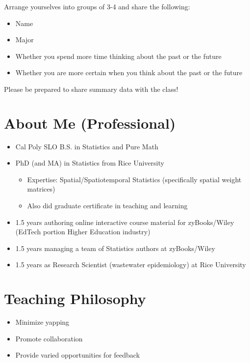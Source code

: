 \documentclass[
  letterpaper,
  DIV=11,
  numbers=noendperiod]{scrreprt}
\begin{document}
Arrange yourselves into groups of 3-4 and share the following:

\begin{itemize}
\item
  Name
\item
  Major
\item
  Whether you spend more time thinking about the past or the future
\item
  Whether you are more certain when you think about the past or the
  future
\end{itemize}

Please be prepared to share summary data with the class!

\section{About Me (Professional)}\label{about-me-professional}

\begin{itemize}
\item
  Cal Poly SLO B.S. in Statistics and Pure Math
\item
  PhD (and MA) in Statistics from Rice University

  \begin{itemize}
  \item
    Expertise: Spatial/Spatiotemporal Statistics (specifically spatial
    weight matrices)
  \item
    Also did graduate certificate in teaching and learning
  \end{itemize}
\item
  1.5 years authoring online interactive course material for
  zyBooks/Wiley (EdTech portion Higher Education industry)
\item
  1.5 years managing a team of Statistics authors at zyBooks/Wiley
\item
  1.5 years as Research Scientist (wastewater epidemiology) at Rice
  University
\end{itemize}

\section{Teaching Philosophy}\label{teaching-philosophy}

\begin{itemize}
\item
  Minimize yapping
\item
  Promote collaboration
\item
  Provide varied opportunities for feedback
\end{itemize}
\end{document}
